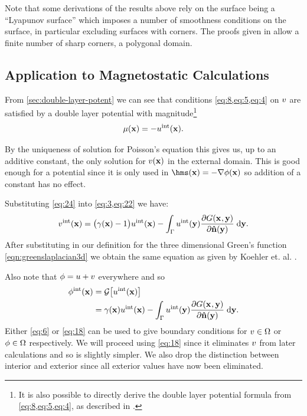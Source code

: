 Note that some derivations of the results above rely on the surface being a ``Lyapunov surface'' which imposes a number of smoothness conditions on the surface, in particular excluding surfaces with corners.
The proofs given in \cite{Sternberg1946} allow a finite number of sharp corners, \ie a polygonal domain.

\subsection{Application to Magnetostatic Calculations}
\label{sec:appl-magn-calc}

From \cref{sec:double-layer-potent} we can see that conditions \cref{eq:8,eq:5,eq:4} on $v$ are satisfied by a double layer potential with magnitude\footnote{It is also possible to directly derive the double layer potential formula from \cref{eq:8,eq:5,eq:4}, as described in \cite[App. 2]{Knittel2011}.}
\begin{equation}
  \label{eq:24}
  \mu(\boldsymbol{\mathrm{x}}) = - u^{\mathrm{int}}(\boldsymbol{\mathrm{x}}).
\end{equation}

By the uniqueness of solution for Poisson's equation this gives us, up to an additive constant, the only solution for $v(\boldsymbol{\mathrm{x}})$ in the external domain.
This is good enough for a potential since it is only used in $\hms(\xv) = - \grad \phim(\xv)$ so addition of a constant has no effect.

Substituting \cref{eq:24} into \cref{eq:3,eq:22} we have:
\begin{equation}
  \label{eq:6}
  v^{\mathrm{int}}(\boldsymbol{\mathrm{x}}) =  \big(\gamma(\boldsymbol{\mathrm{x}}) - 1 \big) u^{\mathrm{int}}(\boldsymbol{\mathrm{x}})
  - \int_{{\Gamma}} u^{\mathrm{int}}(\boldsymbol{\mathrm{y}}) \frac{\partial G(\boldsymbol{\mathrm{x}}_{},\boldsymbol{\mathrm{y}})}{\partial \boldsymbol{\mathrm{\hat{n}}}(\boldsymbol{\mathrm{y}})} {\; \mathrm{{d}}} \boldsymbol{\mathrm{y}}.
\end{equation}
After substituting in our definition for the three dimensional Green's function \cref{eqn:greenslaplacian3d} we obtain the same equation as given by Koehler et. al. \cite{Koehler1997}.

Also note that $\phi = u + v$ everywhere and so
\begin{equation}
  \begin{aligned}
    \label{eq:18}
    \phi^{\mathrm{int}}(\boldsymbol{\mathrm{x}}) &= \mathcal{G} \big[ u^{\mathrm{int}}(\boldsymbol{\mathrm{x}}) \big] \\
    &= \gamma(\boldsymbol{\mathrm{x}}) u^{\mathrm{int}}(\boldsymbol{\mathrm{x}})
    - \int_{{\Gamma}} u^{\mathrm{int}}(\boldsymbol{\mathrm{y}}) \frac{\partial G(\boldsymbol{\mathrm{x}}_{},\boldsymbol{\mathrm{y}})}{\partial \boldsymbol{\mathrm{\hat{n}}}(\boldsymbol{\mathrm{y}})} {\; \mathrm{{d}}} \boldsymbol{\mathrm{y}}.
  \end{aligned}
\end{equation}
Either \cref{eq:6} or \cref{eq:18} can be used to give boundary conditions for $v \in \Omega$ or $\phi \in \Omega$ respectively.
We will proceed using \cref{eq:18} since it eliminates $v$ from later calculations and so is slightly simpler.
We also drop the distinction between interior and exterior since all exterior values have now been eliminated.

